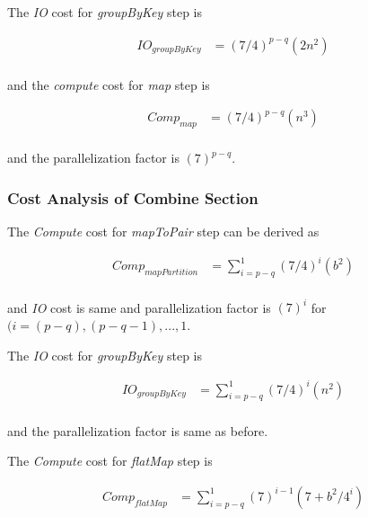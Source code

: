 The \textit{IO} cost for \textit{groupByKey} step is

\begin{equation}
    \begin{aligned}
        IO_{groupByKey}&=(7/4)^{p-q}(2n^{2}) \\        
    \end{aligned}
\end{equation}

and the \textit{compute} cost for \textit{map} step is 

\begin{equation}
    \begin{aligned}
        Comp_{map}&=(7/4)^{p-q}(n^{3}) \\        
    \end{aligned}
\end{equation}

and the parallelization factor is $(7)^{p-q}$.

\subsubsection{Cost Analysis of Combine Section}
The \textit{Compute} cost for \textit{mapToPair} step can be derived as

\begin{equation}
    \begin{aligned}
        Comp_{mapPartition}&=\sum_{i=p-q}^{1}(7/4)^{i}(b^{2}) \\        
    \end{aligned}
\end{equation}

and \textit{IO} cost is same and parallelization factor is $(7)^{i}$ for $(i = (p-q), (p-q-1), ..., 1$.

The \textit{IO} cost for \textit{groupByKey} step is

\begin{equation}
    \begin{aligned}
        IO_{groupByKey}&=\sum_{i=p-q}^{1}(7/4)^{i}(n^{2}) \\        
    \end{aligned}
\end{equation}

and the parallelization factor is same as before.

The \textit{Compute} cost for \textit{flatMap} step is

\begin{equation}
    \begin{aligned}
       Comp_{flatMap}&=\sum_{i=p-q}^{1}(7)^{i-1}(7+b^{2}/4^{i}) \\        
    \end{aligned}
\end{equation}


